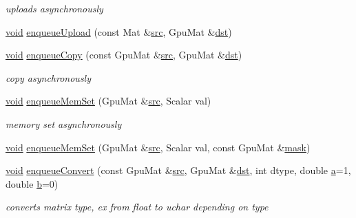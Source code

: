 \begin{DoxyCompactItemize}
\begin{DoxyCompactList}\small\item\em uploads asynchronously \end{DoxyCompactList}\item 
\hyperlink{legacy_8hpp_a8bb47f092d473522721002c86c13b94e}{void} \hyperlink{classcv_1_1gpu_1_1Stream_a28b57361b99056315507a3810d4a5124}{enqueue\-Upload} (const Mat \&\hyperlink{legacy_8hpp_a371cd109b74033bc4366f584edd3dacc}{src}, Gpu\-Mat \&\hyperlink{photo__c_8h_aed13e2a25279b24dc954073233fef7a5}{dst})
\item 
\hyperlink{legacy_8hpp_a8bb47f092d473522721002c86c13b94e}{void} \hyperlink{classcv_1_1gpu_1_1Stream_aad9ea761ff065ce185bce7dae6d477a3}{enqueue\-Copy} (const Gpu\-Mat \&\hyperlink{legacy_8hpp_a371cd109b74033bc4366f584edd3dacc}{src}, Gpu\-Mat \&\hyperlink{photo__c_8h_aed13e2a25279b24dc954073233fef7a5}{dst})
\begin{DoxyCompactList}\small\item\em copy asynchronously \end{DoxyCompactList}\item 
\hyperlink{legacy_8hpp_a8bb47f092d473522721002c86c13b94e}{void} \hyperlink{classcv_1_1gpu_1_1Stream_ac814b1ece44f16da6a2c03d49c1656b6}{enqueue\-Mem\-Set} (Gpu\-Mat \&\hyperlink{legacy_8hpp_a371cd109b74033bc4366f584edd3dacc}{src}, Scalar val)
\begin{DoxyCompactList}\small\item\em memory set asynchronously \end{DoxyCompactList}\item 
\hyperlink{legacy_8hpp_a8bb47f092d473522721002c86c13b94e}{void} \hyperlink{classcv_1_1gpu_1_1Stream_ad16ae4a65528d6b66ba008baf3a6a45c}{enqueue\-Mem\-Set} (Gpu\-Mat \&\hyperlink{legacy_8hpp_a371cd109b74033bc4366f584edd3dacc}{src}, Scalar val, const Gpu\-Mat \&\hyperlink{tracking_8hpp_a6b13ecd2fd6ec7ad422f1d7863c3ad19}{mask})
\item 
\hyperlink{legacy_8hpp_a8bb47f092d473522721002c86c13b94e}{void} \hyperlink{classcv_1_1gpu_1_1Stream_a782ea7eeaf844fa755a2ae5a2eb66f12}{enqueue\-Convert} (const Gpu\-Mat \&\hyperlink{legacy_8hpp_a371cd109b74033bc4366f584edd3dacc}{src}, Gpu\-Mat \&\hyperlink{photo__c_8h_aed13e2a25279b24dc954073233fef7a5}{dst}, int dtype, double \hyperlink{legacy_8hpp_a1031d0e0a97a340abfe0a6ab9e831045}{a}=1, double \hyperlink{legacy_8hpp_ac04272e8ca865b8fba18d36edae9fd2a}{b}=0)
\begin{DoxyCompactList}\small\item\em converts matrix type, ex from float to uchar depending on type \end{DoxyCompactList}\item 

\end{DoxyCompactItemize}
